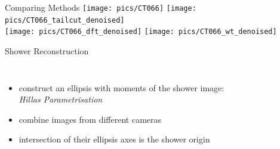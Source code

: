 \documentclass[8pt]{beamer}
\begin{document}
    \begin{frame}{Comparing Methods}
        \centering
        \texttt{[image: pics/CT066]}
        \hspace{5mm}
        \texttt{[image: pics/CT066\_tailcut\_denoised]}\\
        \texttt{[image: pics/CT066\_dft\_denoised]}
        \hspace{5mm}
        \texttt{[image: pics/CT066\_wt\_denoised]}
        
    \end{frame}

    
    \begin{frame}{Shower Reconstruction}
        \begin{columns}
                \begin{itemize}
                    \item construct an ellipsis with moments of the shower image:\\
                    \emph{Hillas Parametrisation}
                    \pause
                    \item combine images from different cameras
                    \pause
                    \item intersection of their ellipsis axes is
                        the shower origin
                \end{itemize}

        \end{columns}

    \end{frame}

    
    
\end{document}
